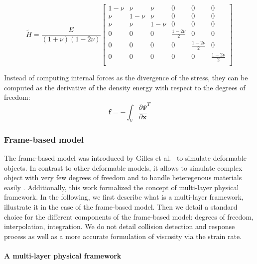 \begin{equation}
\tilde{H} =
\frac{E}{\left(1+\nu\right)\left(1-2\nu\right)}
\begin{bmatrix}
1-\nu & \nu & \nu & 0 & 0 & 0 \\ 
\nu & 1-\nu & \nu & 0 & 0 & 0 \\
\nu & \nu & 1-\nu & 0 & 0 & 0 \\
0 & 0 & 0 & \frac{1-2\nu}{2} & 0 & 0 \\
0 & 0 & 0 & 0 & \frac{1-2\nu}{2} & 0 \\
0 & 0 & 0 & 0 & 0 & \frac{1-2\nu}{2} \\
\end{bmatrix}
\end{equation}

Instead of computing internal forces as the divergence of the stress, they can be computed as the derivative of the density energy with respect to the degrees of freedom:
\begin{equation}
\label{eq:internalForces}
\mathbf{f} = -\int_{V} \frac{\partial \Psi}{\partial \mathbf{x}}^{T}
\end{equation}

\subsubsection{Frame-based model}

The frame-based model was introduced by Gilles et al.~\cite{Gilles2011} to simulate deformable objects. In contrast to other deformable models, it allows to simulate complex object with very few degrees of freedom and to handle heteregenous materials easily \cite{Faure2011}. Additionally, this work formalized the concept of multi-layer physical framework. In the following, we first describe what is a multi-layer framework, illustrate it in the case of the frame-based model. Then we detail a standard choice for the different components of the frame-based model: degrees of freedom, interpolation, integration. We do not detail collision detection and response process as well as a more accurate formulation of viscosity via the strain rate.

\paragraph{A multi-layer physical framework}
 
